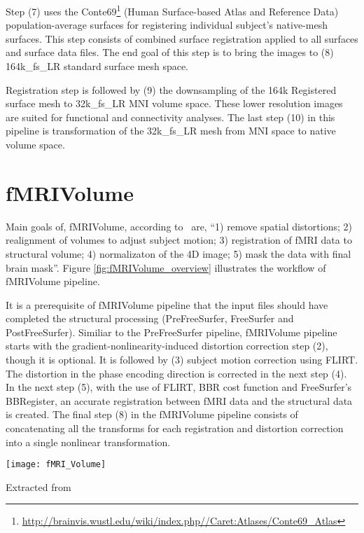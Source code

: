 Step (7) uses the Conte69\footnote{\url{http://brainvis.wustl.edu/wiki/index.php//Caret:Atlases/Conte69\_Atlas}} (Human Surface-based Atlas and Reference Data) population-average surfaces for registering individual subject's native-mesh surfaces. This step consists of combined surface registration applied to all surfaces and surface data files. The end goal of this step is to bring the images to (8) 164k\_fs\_LR standard surface mesh space. 

Registration step is followed by (9) the downsampling of the 164k Registered surface mesh to 32k\_fs\_LR MNI volume space. These lower resolution images are suited for functional and connectivity analyses. The last step (10) in this pipeline is transformation of the 32k\_fs\_LR mesh from MNI space to native volume space. 


\section{fMRIVolume} \label{sec:fMRIVolume}
Main goals of, fMRIVolume, according to~\cite{Gla13} are, ``1) remove spatial distortions; 2) realignment of volumes to adjust subject motion; 3) registration of fMRI data to structural volume; 4) normalizaton of the 4D image; 5) mask the data with final brain mask''. Figure \ref{fig:fMRIVolume_overview} illustrates the workflow of fMRIVolume pipeline.

It is a prerequisite of fMRIVolume pipeline that the input files should have completed the structural processing (PreFreeSurfer, FreeSurfer and PostFreeSurfer). Similiar to the PreFreeSurfer pipeline, fMRIVolume pipeline starts with the gradient-nonlinearity-induced distortion correction step (2), though it is optional. It is followed by (3) subject motion correction using FLIRT. The distortion in the phase encoding direction is corrected in the next step (4). In the next step (5), with the use of FLIRT, BBR cost function and FreeSurfer's BBRegister, an accurate registration between fMRI data and the structural data is created. The final step (8) in the fMRIVolume pipeline consists of concatenating all the transforms for each registration and distortion correction into a single nonlinear transformation.

\begin{center}
  \texttt{[image: fMRI\_Volume]}
  \label{fig:fMRIVolume_overview}
  \caption*{Extracted from \cite{Gla13}}
\end{center}


